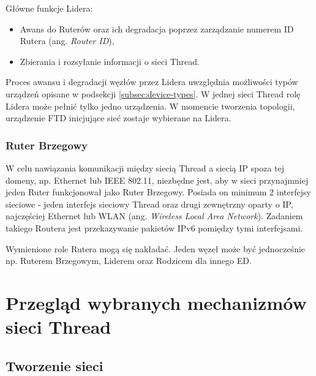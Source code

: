         Główne funkcje Lidera:
        \begin{itemize}
            \item Awans do Ruterów oraz ich degradacja poprzez zarządzanie numerem ID Rutera (ang. \textit{Router ID}),
            \item Zbierania i rozsyłanie informacji o sieci Thread.
        \end{itemize}

        Proces awansu i degradacji węzłów przez Lidera uwzględnia możliwości typów urządzeń opisane w podsekcji \ref{subsec:device-types}. W jednej sieci Thread rolę Lidera może pełnić tylko jedno urządzenia. W momencie tworzenia topologii, urządzenie FTD inicjujące sieć zostaje wybierane na Lidera.
        
        \subsubsection{Ruter Brzegowy}

        W celu nawiązania komunikacji między siecią Thread a siecią IP spoza tej domeny, np. Ethernet lub IEEE 802.11, niezbędne jest, aby w sieci przynajmniej jeden Ruter funkcjonował jako Ruter Brzegowy. Posiada on minimum 2 interfejsy sieciowe - jeden interfejs sieciowy Thread oraz drugi zewnętrzny oparty o IP, najczęściej Ethernet lub WLAN (ang. \textit{Wireless Local Area Network}). Zadaniem takiego Routera jest przekazywanie pakietów IPv6 pomiędzy tymi interfejsami.

    Wymienione role Rutera mogą się nakładać. Jeden węzeł może być jednocześnie np. Ruterem Brzegowym, Liderem oraz Rodzicem dla innego ED.

\section{Przegląd wybranych mechanizmów sieci Thread}

    \subsection{Tworzenie sieci}
    \label{subsec:network-forming}

